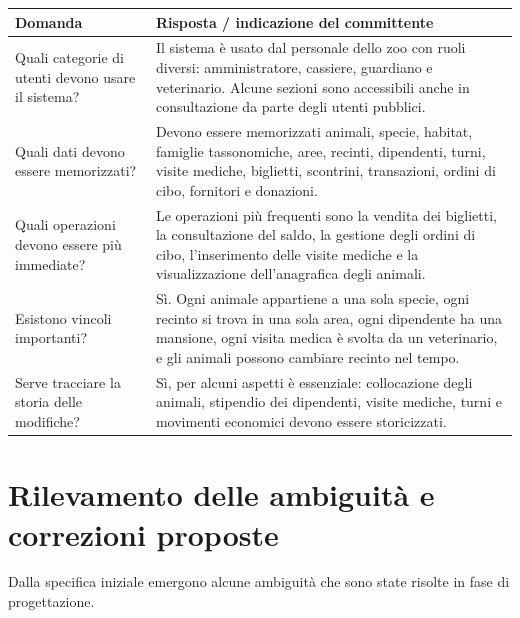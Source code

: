 \documentclass[12pt,a4paper]{report}
\begin{document}
\begin{longtable}{L{4cm} L{10cm}}
\toprule
\textbf{Domanda} & \textbf{Risposta / indicazione del committente} \\
\midrule
\endhead
Quali categorie di utenti devono usare il sistema? &
Il sistema è usato dal personale dello zoo con ruoli diversi: amministratore, cassiere, guardiano e veterinario. Alcune sezioni sono accessibili anche in consultazione da parte degli utenti pubblici. \\

Quali dati devono essere memorizzati? &
Devono essere memorizzati animali, specie, habitat, famiglie tassonomiche, aree, recinti, dipendenti, turni, visite mediche, biglietti, scontrini, transazioni, ordini di cibo, fornitori e donazioni. \\

Quali operazioni devono essere più immediate? &
Le operazioni più frequenti sono la vendita dei biglietti, la consultazione del saldo, la gestione degli ordini di cibo, l'inserimento delle visite mediche e la visualizzazione dell'anagrafica degli animali. \\

Esistono vincoli importanti? &
Sì. Ogni animale appartiene a una sola specie, ogni recinto si trova in una sola area, ogni dipendente ha una mansione, ogni visita medica è svolta da un veterinario, e gli animali possono cambiare recinto nel tempo. \\

Serve tracciare la storia delle modifiche? &
Sì, per alcuni aspetti è essenziale: collocazione degli animali, stipendio dei dipendenti, visite mediche, turni e movimenti economici devono essere storicizzati. \\
\bottomrule
\end{longtable}

\section{Rilevamento delle ambiguità e correzioni proposte}

Dalla specifica iniziale emergono alcune ambiguità che sono state risolte in fase di progettazione.
\end{document}
